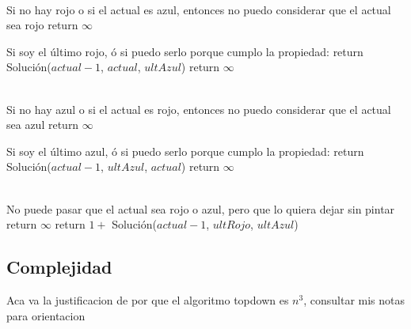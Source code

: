 \begin{algorithm}[H]
\begin{algorithmic}
 \\ 
    \Comment Si no hay rojo o si el actual es azul, entonces no puedo considerar que el actual sea rojo
        \State return $\infty$
    
    \Else \Comment Si soy el último rojo, ó si puedo serlo porque cumplo la propiedad:
            \State return Solución($actual - 1$, $actual$, $ultAzul$)
        \Else 
            \State return $\infty$
        \EndIf 
    \EndIf
\EndProcedure
\end{algorithmic}
\end{algorithm}


\begin{algorithm}[H]
\begin{algorithmic}
 \\ 
    \Comment Si no hay azul o si el actual es rojo, entonces no puedo considerar que el actual sea azul
        \State return $\infty$
    
    \Else \Comment Si soy el último azul, ó si puedo serlo porque cumplo la propiedad:
            \State return Solución($actual - 1$, $ultAzul$, $actual$)
        \Else 
            \State return $\infty$
        \EndIf 
    \EndIf
\EndProcedure
\end{algorithmic}
\end{algorithm} 


\begin{algorithm}[H]
\begin{algorithmic}
 \\
    \Comment No puede pasar que el actual sea rojo o azul, pero que lo quiera dejar sin pintar
        \State return $\infty$
    \Else 
        \State return $1 + $  Solución($actual - 1$, $ultRojo$, $ultAzul$)
    \EndIf
\EndProcedure
\end{algorithmic}
\end{algorithm}


\subsection{Complejidad}

Aca va la justificacion de por que el algoritmo topdown es $n^3$, consultar mis notas para orientacion
